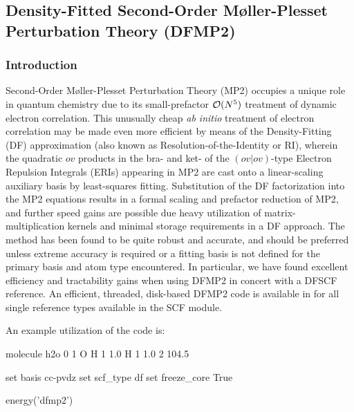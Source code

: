 \subsection{Density-Fitted Second-Order M\o{}ller-Plesset Perturbation Theory (DFMP2)} \label{dfmp2}

\subsubsection{Introduction}

Second-Order M\o{}ller-Plesset Perturbation Theory (MP2) occupies a unique role
in quantum chemistry due to its small-prefactor ${\cal O}(N^5)$ treatment of
dynamic electron correlation. This unusually cheap
\textit{ab initio} treatment of electron correlation may be made even more
efficient by means of the Density-Fitting (DF) approximation (also known as
Resolution-of-the-Identity or RI), wherein the quadratic $ov$ products in the
bra- and ket- of the $(ov|ov)$-type Electron Repulsion Integrals (ERIs)
appearing in MP2 are cast onto a linear-scaling auxiliary basis by least-squares
fitting.  Substitution of the DF factorization into the MP2 equations results in
a formal scaling and prefactor reduction of MP2, and further speed gains are
possible due heavy utilization of matrix-multiplication kernels and minimal
storage requirements in a DF approach. The method has been found to be quite
robust and accurate, and should be preferred unless extreme accuracy is required
or a fitting basis is not defined for the primary basis and atom type
encountered. In particular, we have found excellent efficiency and tractability
gains when using DFMP2 in concert with a DFSCF reference.  An efficient,
threaded, disk-based DFMP2 code is available in \PSIfour for all single
reference types available in the SCF module.  

An example utilization of the code is:
\begin{Snippet}
molecule h2o {
0 1
O
H 1 1.0
H 1 1.0 2 104.5
}

set basis cc-pvdz
set scf_type df
set freeze_core True

energy('dfmp2')
\end{Snippet}

